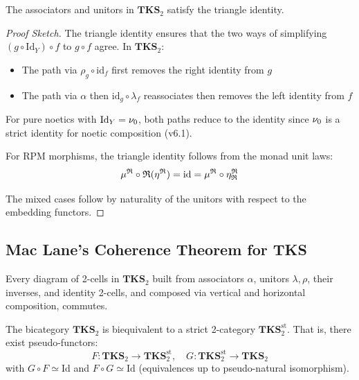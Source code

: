 \begin{theorem}
\label{thm:tks-triangle}
The associators and unitors in $\mathbf{TKS}_2$ satisfy the triangle identity.
\end{theorem}

\begin{proof}[Proof Sketch]
The triangle identity ensures that the two ways of simplifying $(g \circ \mathrm{Id}_Y) \circ f$
to $g \circ f$ agree. In $\mathbf{TKS}_2$:
\begin{itemize}
  \item The path via $\rho_g \circ \mathrm{id}_f$ first removes the right identity from $g$
  \item The path via $\alpha$ then $\mathrm{id}_g \circ \lambda_f$ reassociates then removes
        the left identity from $f$
\end{itemize}

For pure noetics with $\mathrm{Id}_Y = \nu_{0}$, both paths reduce to the identity
since $\nu_{0}$ is a strict identity for noetic composition (v6.1).

For RPM morphisms, the triangle identity follows from the monad unit laws:
\[
  \mu^{\mathfrak{R}} \circ \mathfrak{R}(\eta^{\mathfrak{R}}) = \mathrm{id} = \mu^{\mathfrak{R}} \circ \eta^{\mathfrak{R}}_{\mathfrak{R}}
\]

The mixed cases follow by naturality of the unitors with respect to the embedding
functors.
\end{proof}

\subsection{Mac Lane's Coherence Theorem for TKS}

\begin{theorem}
\label{thm:maclane-tks}
Every diagram of 2-cells in $\mathbf{TKS}_2$ built from associators $\alpha$, unitors
$\lambda, \rho$, their inverses, and identity 2-cells, and composed via vertical and
horizontal composition, commutes.
\end{theorem}

\begin{corollary}
\label{cor:strictification}
The bicategory $\mathbf{TKS}_2$ is biequivalent to a strict 2-category $\mathbf{TKS}_2^{\mathrm{st}}$.
That is, there exist pseudo-functors:
\[
  F : \mathbf{TKS}_2 \to \mathbf{TKS}_2^{\mathrm{st}}, \quad
  G : \mathbf{TKS}_2^{\mathrm{st}} \to \mathbf{TKS}_2
\]
with $G \circ F \simeq \mathrm{Id}$ and $F \circ G \simeq \mathrm{Id}$ (equivalences
up to pseudo-natural isomorphism).
\end{corollary}

